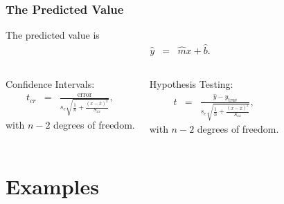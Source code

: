 \begin{frame}
  \frametitle{The Predicted Value}

  The predicted value is 
  \begin{eqnarray*}
    \hat{y} & = & \hat{m} x + \hat{b}.
  \end{eqnarray*}



    \begin{columns}

      Confidence Intervals:
      \begin{eqnarray*}
        t_{cr} & = & \frac{\mathrm{error}}{s_e \sqrt{\frac{1}{n}+\frac{(x-\bar{x})^2}{S_{xx}}}},
      \end{eqnarray*}
      with $n-2$ degrees of freedom.


      Hypothesis Testing:
      \begin{eqnarray*}
        t & = & \frac{\hat{y}-y_{\mathrm{true}}}{s_e \sqrt{\frac{1}{n}+\frac{(x-\bar{x})^2}{S_{xx}}}},
      \end{eqnarray*}
      with $n-2$ degrees of freedom.

    
    \end{columns}


\end{frame}


\section{Examples}

